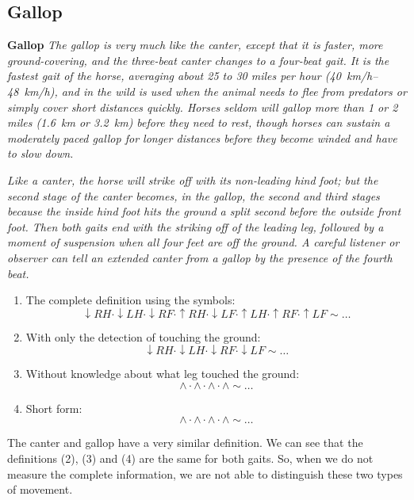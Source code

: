 \subsection{Gallop}
\begin{definition}{\textbf{Gallop}}
    \label{def:gallop}
    \textit{The gallop is very much like the canter, except that it is faster, more ground-covering, and the three-beat canter changes to a four-beat gait. It is the fastest gait of the horse, averaging about 25 to 30 miles per hour (\SIrange{40}{48}{km/h}), and in the wild is used when the animal needs to flee from predators or simply cover short distances quickly. Horses seldom will gallop more than 1 or 2 miles (\SI{1.6}{km} or \SI{3.2}{km}) before they need to rest, though horses can sustain a moderately paced gallop for longer distances before they become winded and have to slow down.}
    
    \textit{Like a canter, the horse will strike off with its non-leading hind foot; but the second stage of the canter becomes, in the gallop, the second and third stages because the inside hind foot hits the ground a split second before the outside front foot. Then both gaits end with the striking off of the leading leg, followed by a moment of suspension when all four feet are off the ground. A careful listener or observer can tell an extended canter from a gallop by the presence of the fourth beat.} \cite{Harrisc1993}
    
    \begin{enumerate}
        \item The complete definition using the symbols:
        $$ \downarrow RH \cdot \downarrow LH \cdot \downarrow RF \cdot \uparrow RH \cdot \downarrow LF \cdot \uparrow LH \cdot \uparrow RF \cdot \uparrow LF \sim \dots $$
        \item With only the detection of touching the ground:
        $$ \downarrow RH \cdot \downarrow LH \cdot \downarrow RF \cdot \downarrow LF \sim \dots $$
        \item Without knowledge about what leg touched the ground:
        $$ \wedge \cdot \wedge \cdot \wedge \cdot \wedge \sim \dots $$
        \item Short form:
        $$ \wedge \cdot \wedge \cdot \wedge \cdot \wedge \sim \dots $$
    \end{enumerate}
\end{definition}

\begin{remark}
    The canter and gallop have a very similar definition. We can see that the definitions (2), (3) and (4) are the same for both gaits. So, when we do not measure the complete information, we are not able to distinguish these two types of movement.
\end{remark}

